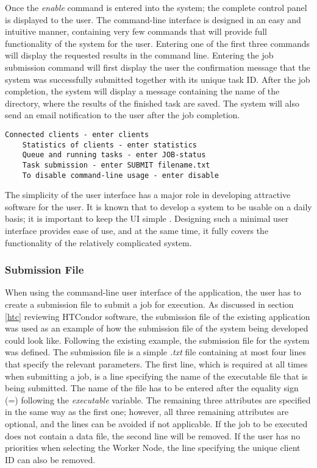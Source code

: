 \documentclass[10pt]{report}
\begin{document}
\noindent Once the \textit{enable} command is entered into the system; the complete control panel is displayed to the user. The command-line interface is designed in an easy and intuitive manner, containing very few commands that will provide full functionality of the system for the user. Entering one of the first three commands will display the requested results in the command line. Entering the job submission command will first display the user the confirmation message that the system was successfully submitted together with its unique task ID. After the job completion, the system will display a message containing the name of the directory, where the results of the finished task are saved. The system will also send an email notification to the user after the job completion.

\begin{lstlisting}[style=DOS]
    Connected clients - enter clients
    Statistics of clients - enter statistics
    Queue and running tasks - enter JOB-status
    Task submission - enter SUBMIT filename.txt
    To disable command-line usage - enter disable
\end{lstlisting}

\noindent The simplicity of the user interface has a major role in developing attractive software for the user. It is known that to develop a system to be usable on a daily basis; it is important to keep the UI simple \cite{ui}. Designing such a minimal user interface provides ease of use, and at the same time, it fully covers the functionality of the relatively complicated system.

\subsubsection{Submission File}

When using the command-line user interface of the application, the user has to create a submission file to submit a job for execution. As discussed in section \ref{htc} reviewing HTCondor software, the submission file of the existing application was used as an example of how the submission file of the system being developed could look like. Following the existing example, the submission file for the system was defined. The submission file is a simple \textit{.txt} file containing at most four lines that specify the relevant parameters. The first line, which is required at all times when submitting a job, is a line specifying the name of the executable file that is being submitted. The name of the file has to be entered after the equality sign (=) following the \textit{executable} variable. The remaining three attributes are specified in the same way as the first one; however, all three remaining attributes are optional, and the lines can be avoided if not applicable. If the job to be executed does not contain a data file, the second line will be removed. If the user has no priorities when selecting the Worker Node, the line specifying the unique client ID can also be removed.
\end{document}
